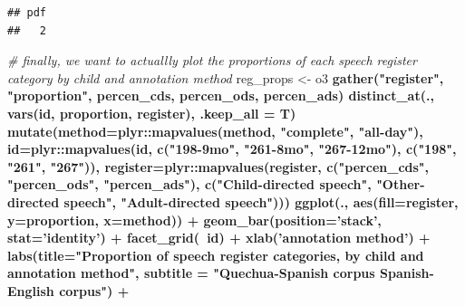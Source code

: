\documentclass[
]{article}
\newenvironment{Shaded}{\begin{snugshade}}{\end{snugshade}}
\newcommand{\CommentTok}[1]{\textcolor[rgb]{0.56,0.35,0.01}{\textit{#1}}}
\newcommand{\DataTypeTok}[1]{\textcolor[rgb]{0.13,0.29,0.53}{#1}}
\newcommand{\KeywordTok}[1]{\textcolor[rgb]{0.13,0.29,0.53}{\textbf{#1}}}
\newcommand{\NormalTok}[1]{#1}
\newcommand{\OperatorTok}[1]{\textcolor[rgb]{0.81,0.36,0.00}{\textbf{#1}}}
\newcommand{\StringTok}[1]{\textcolor[rgb]{0.31,0.60,0.02}{#1}}
\begin{document}
\begin{verbatim}
## pdf 
##   2
\end{verbatim}

\begin{Shaded}
\begin{Highlighting}[]
\CommentTok{# finally, we want to actuallly plot the proportions of each speech register category by child and annotation method}
\NormalTok{reg_props <-}\StringTok{ }\NormalTok{o3 }\OperatorTok{%
\StringTok{  }\KeywordTok{gather}\NormalTok{(}\StringTok{"register"}\NormalTok{, }\StringTok{"proportion"}\NormalTok{, percen_cds, percen_ods, percen_ads) }\OperatorTok{%
\StringTok{  }\KeywordTok{distinct_at}\NormalTok{(., }\KeywordTok{vars}\NormalTok{(id, proportion, register), }\DataTypeTok{.keep_all =}\NormalTok{ T) }\OperatorTok{%
\StringTok{  }\KeywordTok{mutate}\NormalTok{(}\DataTypeTok{method=}\NormalTok{plyr}\OperatorTok{::}\KeywordTok{mapvalues}\NormalTok{(method, }\StringTok{"complete"}\NormalTok{, }\StringTok{"all-day"}\NormalTok{),}
         \DataTypeTok{id=}\NormalTok{plyr}\OperatorTok{::}\KeywordTok{mapvalues}\NormalTok{(id, }\KeywordTok{c}\NormalTok{(}\StringTok{"198-9mo"}\NormalTok{, }\StringTok{"261-8mo"}\NormalTok{, }\StringTok{"267-12mo"}\NormalTok{), }\KeywordTok{c}\NormalTok{(}\StringTok{"198"}\NormalTok{, }\StringTok{"261"}\NormalTok{, }\StringTok{"267"}\NormalTok{)),}
         \DataTypeTok{register=}\NormalTok{plyr}\OperatorTok{::}\KeywordTok{mapvalues}\NormalTok{(register, }\KeywordTok{c}\NormalTok{(}\StringTok{"percen_cds"}\NormalTok{, }\StringTok{"percen_ods"}\NormalTok{, }\StringTok{"percen_ads"}\NormalTok{), }\KeywordTok{c}\NormalTok{(}\StringTok{"Child-directed speech"}\NormalTok{, }\StringTok{"Other-directed speech"}\NormalTok{, }\StringTok{"Adult-directed speech"}\NormalTok{))) }\OperatorTok{%
\StringTok{  }\KeywordTok{ggplot}\NormalTok{(., }\KeywordTok{aes}\NormalTok{(}\DataTypeTok{fill=}\NormalTok{register, }\DataTypeTok{y=}\NormalTok{proportion, }\DataTypeTok{x=}\NormalTok{method)) }\OperatorTok{+}
\StringTok{  }\KeywordTok{geom_bar}\NormalTok{(}\DataTypeTok{position=}\StringTok{'stack'}\NormalTok{, }\DataTypeTok{stat=}\StringTok{'identity'}\NormalTok{) }\OperatorTok{+}
\StringTok{  }\KeywordTok{facet_grid}\NormalTok{(}\OperatorTok{~}\NormalTok{id) }\OperatorTok{+}
\StringTok{  }\KeywordTok{xlab}\NormalTok{(}\StringTok{'annotation method'}\NormalTok{) }\OperatorTok{+}
\StringTok{  }\KeywordTok{labs}\NormalTok{(}\DataTypeTok{title=}\StringTok{"Proportion of speech register categories, by child and annotation method"}\NormalTok{,}
       \DataTypeTok{subtitle =} \StringTok{"Quechua-Spanish corpus                                       Spanish-English corpus"}\NormalTok{) }\OperatorTok{+}
}}}}
\end{Highlighting}
\end{Shaded}
\end{document}
